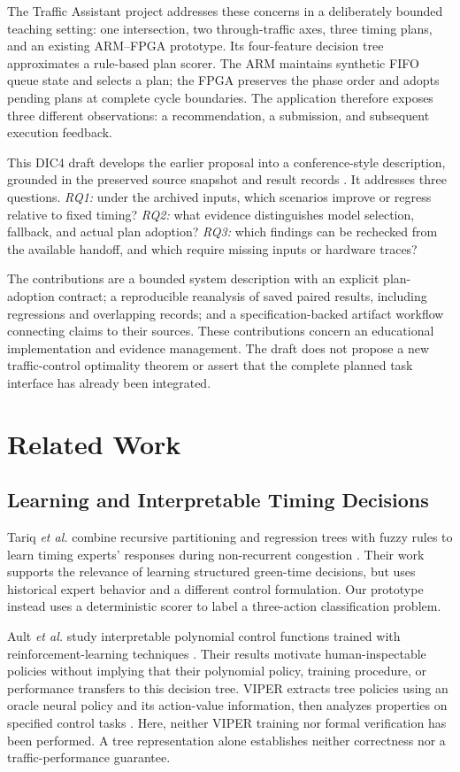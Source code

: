 \documentclass[conference]{IEEEtran}
\begin{document}
The Traffic Assistant project addresses these concerns in a deliberately bounded teaching setting: one intersection, two through-traffic axes, three timing plans, and an existing ARM--FPGA prototype. Its four-feature decision tree approximates a rule-based plan scorer. The ARM maintains synthetic FIFO queue state and selects a plan; the FPGA preserves the phase order and adopts pending plans at complete cycle boundaries. The application therefore exposes three different observations: a recommendation, a submission, and subsequent execution feedback.

This DIC4 draft develops the earlier proposal into a conference-style description, grounded in the preserved source snapshot and result records \cite{projectdesign,projecthost,projectreport}. It addresses three questions. \emph{RQ1:} under the archived inputs, which scenarios improve or regress relative to fixed timing? \emph{RQ2:} what evidence distinguishes model selection, fallback, and actual plan adoption? \emph{RQ3:} which findings can be rechecked from the available handoff, and which require missing inputs or hardware traces?

The contributions are a bounded system description with an explicit plan-adoption contract; a reproducible reanalysis of saved paired results, including regressions and overlapping records; and a specification-backed artifact workflow connecting claims to their sources. These contributions concern an educational implementation and evidence management. The draft does not propose a new traffic-control optimality theorem or assert that the complete planned task interface has already been integrated.

\section{Related Work}
\subsection{Learning and Interpretable Timing Decisions}
Tariq \emph{et al.} combine recursive partitioning and regression trees with fuzzy rules to learn timing experts' responses during non-recurrent congestion \cite{tariq2020signal}. Their work supports the relevance of learning structured green-time decisions, but uses historical expert behavior and a different control formulation. Our prototype instead uses a deterministic scorer to label a three-action classification problem.

Ault \emph{et al.} study interpretable polynomial control functions trained with reinforcement-learning techniques \cite{ault2020interpretable}. Their results motivate human-inspectable policies without implying that their polynomial policy, training procedure, or performance transfers to this decision tree. VIPER extracts tree policies using an oracle neural policy and its action-value information, then analyzes properties on specified control tasks \cite{bastani2018viper}. Here, neither VIPER training nor formal verification has been performed. A tree representation alone establishes neither correctness nor a traffic-performance guarantee.
\end{document}
